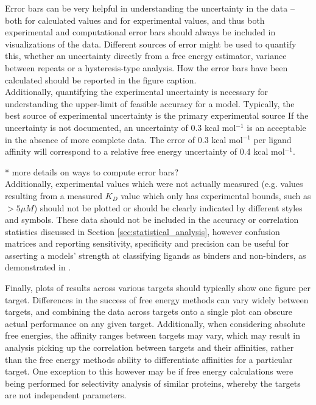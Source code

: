 \documentclass[9pt,bestpractices]{livecoms}
\begin{document}
Error bars can be very helpful in understanding the uncertainty in the data -- both for calculated values and for experimental values, and thus both experimental and computational error bars should always be included in visualizations of the data. Different sources of error might be used to quantify this, whether an uncertainty directly from a free energy estimator, variance between repeats or a hysteresis-type analysis. How the error bars have been calculated should be reported in the figure caption.\\
Additionally, quantifying the experimental uncertainty is necessary for understanding the upper-limit of feasible accuracy for a model. Typically, the best source of experimental uncertainty is the primary experimental source If the uncertainty is not documented, an uncertainty of 0.3 kcal mol$^{-1}$ is an acceptable in the absence of more complete data\cite{Steves}. The error of 0.3 kcal mol$^{-1}$ per ligand affinity will correspond to a relative free energy uncertainty of 0.4 kcal mol$^{-1}$.


* more details on ways to compute error bars?\\
Additionally, experimental values which were not actually measured (e.g. values resulting from a measured $K_D$ value which only has experimental bounds, such as $> 5 \mu M$) should not be plotted or should be clearly indicated by different styles and symbols. These data should not be included in the accuracy or correlation statistics discussed in Section \ref{sec:statistical_analysis}, however confusion matrices and reporting sensitivity, specificity and precision can be useful for asserting a models' strength at classifying ligands as binders and non-binders, as demonstrated in \cite{hauser2018predicting}.

Finally, plots of results across various targets should typically show one figure per target. Differences in the success of free energy methods can vary widely between targets, and combining the data across targets onto a single plot can obscure actual performance on any given target. Additionally, when considering absolute free energies, the affinity ranges between targets may vary, which may result in analysis picking up the correlation between targets and their affinities, rather than the free energy methods ability to differentiate affinities for a particular target. One exception to this however may be if free energy calculations were being performed for selectivity analysis of similar proteins, whereby the targets are not independent parameters.\cite{aldeghi2017predictions}
\end{document}
